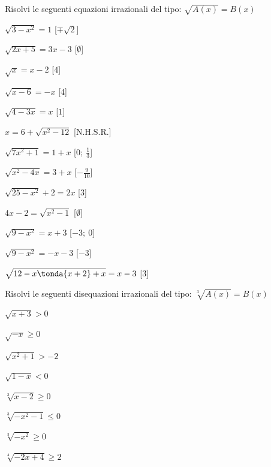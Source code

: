 \begin{esercizio}\label{ese:03.1}
Risolvi le seguenti equazioni irrazionali del tipo:
\(\sqrt{A(x)} = B(x)\)
\begin{multicols}{2}
\begin{enumeratea}
\item \(\sqrt{3 -x^2} = 1\) \hfill [\(\mp \sqrt{2}\)]
\item \(\sqrt{2x +5} = 3x -3\) \hfill [\(\emptyset\)]
\item \(\sqrt{x} = x-2\) \hfill [\(4\)]
\item \(\sqrt{x -6} = -x\) \hfill [\(4\)]
\item \(\sqrt{4 -3x} = x\) \hfill [\(1\)]
\item \(x = 6 +\sqrt{x^2 -12}\) \hfill [N.H.S.R.]
\item \(\sqrt{7x^2 +1} = 1 +x\) \hfill [\(0;~\frac{1}{3}\)]
\item \(\sqrt{x^2 -4x} = 3 +x\) \hfill [\(-\frac{9}{10}\)]
\item \(\sqrt{25 -x^2} +2 = 2x\) \hfill [\(3\)]
\item \(4x -2 = \sqrt{x^2 -1}\) \hfill [\(\emptyset\)]
\item \(\sqrt{9 -x^2} = x +3\) \hfill [\(-3;~0\)]
\item \(\sqrt{9 -x^2} = -x -3\) \hfill [\(-3\)]
\item \(\sqrt{12 -x\tonda{x +2} +x} = x -3\) \hfill [\(3\)]
\end{enumeratea}
\end{multicols}
\end{esercizio}

\begin{esercizio}\label{ese:03.1}
Risolvi le seguenti disequazioni irrazionali del tipo:
\(\sqrt[3]{A(x)} = B(x)\)
\begin{multicols}{2}
\begin{enumeratea}
\item \(\sqrt{x+3} > 0\)
\item \(\sqrt{-x} \geq 0 \)
\item \(\sqrt{x^2 +1} > -2 \)
\item \(\sqrt{1 -x} < 0\)
\item \(\sqrt[3]{x-2} \geq 0\)
\item \(\sqrt[3]{-x^2-1} \leq 0\)
\item \(\sqrt[3]{-x^2} \geq 0\)
\item \(\sqrt[4]{-2x +4} \geq 2\)
\end{enumeratea}
\end{multicols}
\end{esercizio}

